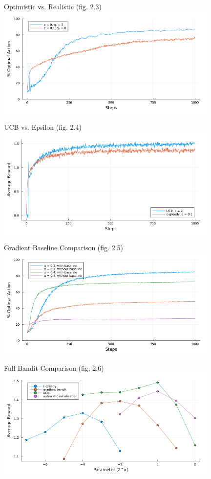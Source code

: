 \documentclass{beamer}
\begin{document}
\begin{frame}{Optimistic vs. Realistic (fig. 2.3)}
	\includegraphics[width=11cm]{ten_armed_testbed_optimistic.png}
\end{frame}
\begin{frame}{UCB vs. Epsilon (fig. 2.4)}
	\includegraphics[width=11cm]{ten_armed_testbed_ucb.png}
\end{frame}
\begin{frame}{Gradient Baseline Comparison (fig. 2.5)}
	\includegraphics[width=11cm]{ten_armed_testbed_gradient.png}
\end{frame}
\begin{frame}{Full Bandit Comparison (fig. 2.6)}
	\includegraphics[width=11cm]{ten_armed_testbed_comparison.png}
\end{frame}
  
  
  
\end{document}
